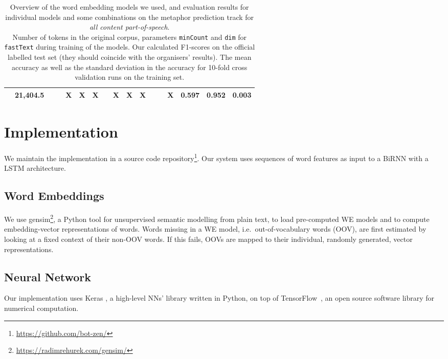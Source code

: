 \documentclass[11pt,a4paper]{article}
\newcommand\fT{\texttt{fastText}\xspace}
\begin{document}
\begin{table*}[t]
\begin{center}
\begin{tabular}{|l|S[table-format=6.1]|r|r||c|c|c|c|c|c|c|c|c|c||r|rr|}
    & 21,404.5  &  &   & X  & X & X  &  & X  & X & X &  &  & X & 0.597  & 0.952 & 0.003   \\
\hline
\end{tabular}
\end{center}
\caption{\label{tab:models}Overview of the word embedding models we used, and evaluation results for individual models and some combinations on the metaphor prediction track for \emph{all content part-of-speech}. \\ Number of tokens in the original corpus, parameters \texttt{minCount} and \texttt{dim} for \fT during training of the models. Our calculated F1-scores on the official labelled test set (they should coincide with the organisers' results). 
The mean accuracy as well as the standard deviation in the accuracy
for 10-fold cross validation runs on the training set.} 
\end{table*}




\section{Implementation} %
\label{sec:implementation}

We maintain the implementation in a source code repository\footnote{\url{https://github.com/bot-zen/}}.
Our system uses sequences of word features as input to a BiRNN with a LSTM architecture.


\subsection{Word Embeddings} %

We use gensim\footnote{\url{https://radimrehurek.com/gensim/}}, a Python tool for unsupervised semantic modelling from plain text, to load pre-computed WE models and to compute embedding-vector representations of words.
Words missing in a WE model, i.e.~out-of-vocabulary words (OOV), are first estimated by looking at a fixed context of their non-OOV words.
If this fails, OOVs are mapped to their individual, randomly generated, vector representations.


\subsection{Neural Network} %

Our implementation uses Keras \cite{chollet2015}, a high-level NNs' library written in Python, on top of TensorFlow~\cite{tensorflow2016}, an open source software library for numerical computation.
\end{document}
